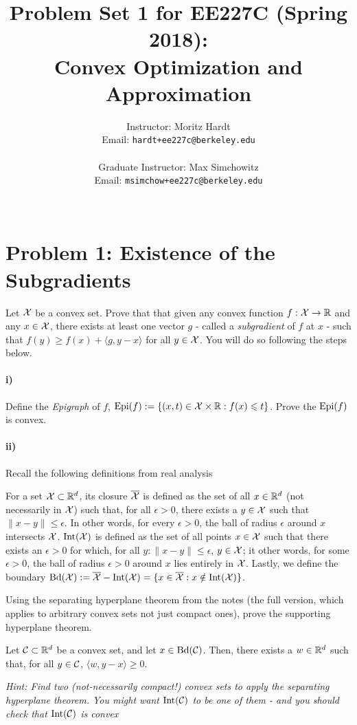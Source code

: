 \documentclass[12pt]{article}
\title{Problem Set 1 for EE227C (Spring 2018):\\
 Convex Optimization and Approximation }
\author{Instructor: Moritz Hardt\\
{\small Email: \tt hardt+ee227c@berkeley.edu}\\ ~\\
Graduate Instructor: Max Simchowitz\\
{\small Email: \tt msimchow+ee227c@berkeley.edu}\\ ~\\
}
\begin{document}
\maketitle




\section*{Problem 1: Existence of the Subgradients}
Let ${\cal X}$ be a convex set. Prove that that given any convex function $f: {\cal X} \to \mathbb{R}$ and any $x \in {\cal X}$, there exists at least one vector $g$ - called a \emph{subgradient} of $f$ at $x$ - such that $f(y) \ge f(x) + \langle g, y - x \rangle$ for all $y \in {\cal X}$. You will do so following the steps below. 
\paragraph{i)} Define the \emph{Epigraph} of $f$, $\mathrm{Epi}(f) := \{(x,t) \in {\cal X} \times \mathbb{R}: f(x) \leqslant t\}$. Prove the $\mathrm{Epi}(f)$ is convex. 

\paragraph{ii)} Recall the following definitions from real analysis
\begin{definition*} For a set ${\cal X} \subset \mathbb{R}^d$, its closure $\overline{{\cal X}}$ is defined as the set of all $x \in \mathbb{R}^d$ (not necessarily in ${\cal X}$) such that, for all $\epsilon > 0$, there exists a $y \in {\cal X}$ such that $\|x - y\| \le \epsilon$. In other words, for every $\epsilon > 0$, the ball of radius $\epsilon$ around $x$ intersects ${\cal X}$. $\mathrm{Int}({\cal X})$ is defined as the set of all points $x \in {\cal X}$ such that there exists an $\epsilon > 0$ for which, for all $y: \|x-y\| \le \epsilon$, $y \in {\cal X}$; it other words, for some $\epsilon > 0$, the ball of radius $\epsilon > 0$ around $x$ lies entirely in ${\cal X}$. Lastly, we define the boundary $\mathrm{Bd}({\cal X}) := \overline{{\cal X}} - \mathrm{Int}({\cal X}) = \{x \in \overline{{\cal X}} : x \notin \mathrm{Int}({\cal X})\}$. 
\end{definition*}


Using the separating hyperplane theorem from the notes (the full version, which applies to arbitrary convex sets not just compact ones), prove the supporting hyperplane theorem.
\begin{theorem*} Let ${\cal C} \subset \mathbb{R}^d$ be a convex set, and let $x \in \mathrm{Bd}({\cal C})$. Then, there exists a $w \in \mathbb{R}^d$ such that, for all $y \in {\cal C}$, $\langle w, y - x \rangle \ge 0$. 
\end{theorem*}
\emph{Hint:  Find two (not-necessarily compact!) convex sets to apply the separating hyperplane theorem. You might want $\mathrm{Int}({\cal C})$ to be one of them - and you should check that $\mathrm{Int}({\cal C})$ is convex } 
\end{document}
